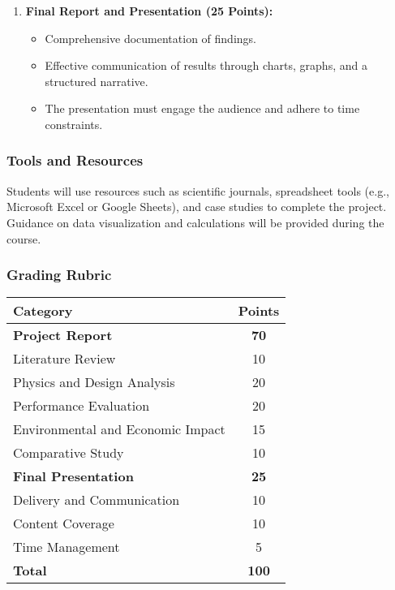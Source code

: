 \documentclass[11pt]{article}
\begin{document}
\begin{enumerate}
    \item \textbf{Final Report and Presentation (25 Points):}
    \begin{itemize}
        \item Comprehensive documentation of findings.
        \item Effective communication of results through charts, graphs, and a structured narrative.
        \item The presentation must engage the audience and adhere to time constraints.
    \end{itemize}
\end{enumerate}

\subsubsection*{Tools and Resources}

Students will use resources such as scientific journals, spreadsheet tools (e.g., Microsoft Excel or Google Sheets), and case studies to complete the project. Guidance on data visualization and calculations will be provided during the course.

\subsubsection*{Grading Rubric}

\begin{center}
\begin{tabular}{|l|c|}
\hline
\textbf{Category} & \textbf{Points} \\
\hline
\textbf{Project Report} & \textbf{70} \\
Literature Review & 10 \\
Physics and Design Analysis & 20 \\
Performance Evaluation & 20 \\
Environmental and Economic Impact & 15 \\
Comparative Study & 10 \\
 \hline
        \textbf{Final Presentation} & \textbf{25} \\
        Delivery and Communication & 10 \\
        Content Coverage & 10 \\
        Time Management & 5 \\
        \hline
\hline
\textbf{Total} & \textbf{100} \\
\hline
\end{tabular}
\end{center}
\end{document}
